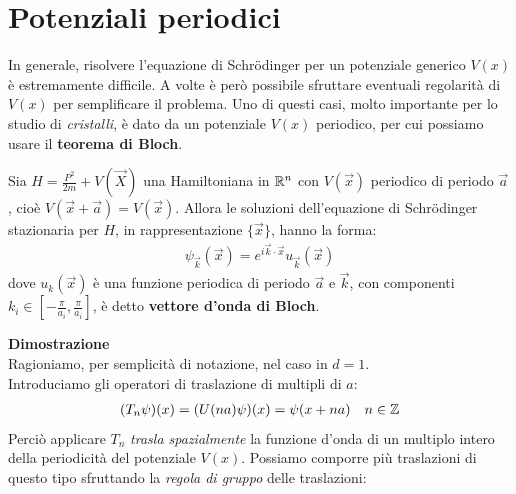 \documentclass[../../FisicaTeorica.tex]{subfiles}
\begin{document}

\section{Potenziali periodici}
In generale, risolvere l'equazione di Schr\"odinger per un potenziale generico $V(x)$ è estremamente difficile. A volte è però possibile sfruttare eventuali regolarità di $V(x)$ per semplificare il problema. Uno di questi casi, molto importante per lo studio di \textit{cristalli}, è dato da un potenziale $V(x)$ periodico, per cui possiamo usare il \textbf{teorema di Bloch}. 
\begin{thm}
Sia $H= \frac{P^2}{2m} + V(\vec{X})$ una Hamiltoniana in $\mathbb{R}^n$ con $V(\vec{x})$ periodico di periodo $\vec{a}$, cioè $V(\vec{x}+\vec{a})=V(\vec{x})$. Allora le soluzioni dell'equazione di Schr\"odinger stazionaria per $H$, in rappresentazione $\{\vec{x}\}$, hanno la forma:
\begin{align*}
\psi_{\vec{k}}(\vec{x}) = e^{i\vec{k}\cdot \vec{x}} u_{\vec{k}}(\vec{x})
\end{align*}
dove $u_k(\vec{x})$ è una funzione periodica di periodo $\vec{a}$ e $\vec{k}$, con componenti $k_i \in \left[-\frac{\pi}{a_i},\frac{\pi}{a_i}\right]$, è detto \textbf{vettore d'onda di Bloch}.
\end{thm}
\textbf{Dimostrazione}\\
Ragioniamo, per semplicità di notazione, nel caso in $d=1$.\\
 Introduciamo gli operatori di traslazione di multipli di $a$:
\begin{align*}
(T_n \psi)(x) = (U(na)\psi)(x)=\psi(x+na) \quad n\in \mathbb{Z}
\end{align*}
Perciò applicare $T_n$ \textit{trasla spazialmente} la funzione d'onda di un multiplo intero della periodicità del potenziale $V(x)$. Possiamo comporre più traslazioni di questo tipo sfruttando la \textit{regola di gruppo} delle traslazioni:
\end{document}
